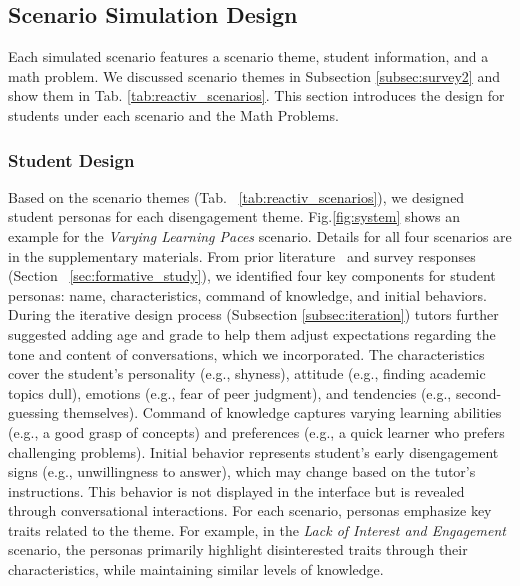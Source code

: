 \subsection{Scenario Simulation Design}
\label{subsec:senario_design}

Each simulated scenario features a scenario theme, student information, and a math problem. We discussed scenario themes in Subsection \ref{subsec:survey2} and show them in Tab. \ref{tab:reactiv_scenarios}. This section introduces the design for students under each scenario and the Math Problems.

\subsubsection{Student Design}
Based on the scenario themes (Tab. ~\ref{tab:reactiv_scenarios}), we designed student personas for each disengagement theme. Fig.\ref{fig:system} shows an example for the \textit{Varying Learning Paces} scenario. Details for all four scenarios are in the supplementary materials. From prior literature~\cite{gpteach,li2024agent} and survey responses (Section ~\ref{sec:formative_study}), we identified four key components for student personas: name, characteristics, command of knowledge, and initial behaviors. During the iterative design process (Subsection \ref{subsec:iteration}) tutors further suggested adding age and grade to help them adjust expectations regarding the tone and content of conversations, which we incorporated. The characteristics cover the student's personality (e.g., shyness), attitude (e.g., finding academic topics dull), emotions (e.g., fear of peer judgment), and tendencies (e.g., second-guessing themselves). Command of knowledge captures varying learning abilities (e.g., a good grasp of concepts) and preferences (e.g., a quick learner who prefers challenging problems). Initial behavior represents student's early disengagement signs (e.g., unwillingness to answer), which may change based on the tutor's instructions. This behavior is not displayed in the interface but is revealed through conversational interactions.
%
For each scenario, personas emphasize key traits related to the theme. For example, in the \textit{Lack of Interest and Engagement} scenario, the personas primarily highlight disinterested traits through their characteristics, while maintaining similar levels of knowledge.



